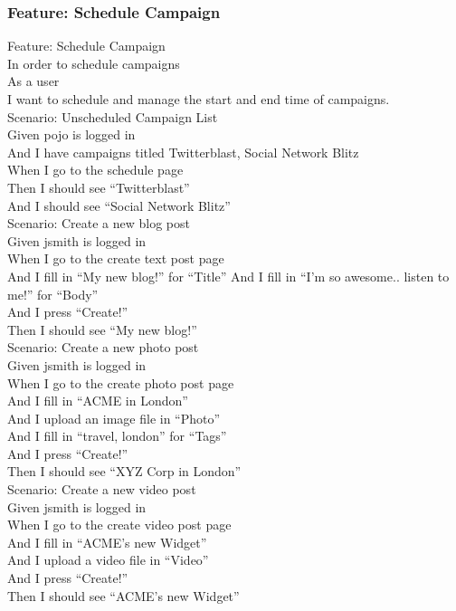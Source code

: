 \documentclass[12pt]{article}
\begin{document}
\subsubsection{Feature: Schedule Campaign}

\begin{hangparas}{0.25in}{1}
Feature: Schedule Campaign \\
In order to schedule campaigns \\
As a user \\
I want to schedule and manage the start and end time of campaigns. \\

Scenario: Unscheduled Campaign List \\
  Given pojo is logged in \\
  And I have campaigns titled Twitterblast, Social Network Blitz \\
  When I go to the schedule page \\
  Then I should see ``Twitterblast'' \\
  And I should see ``Social Network Blitz'' \\
  
Scenario: Create a new blog post \\
  Given jsmith is logged in \\
  When I go to the create text post page \\
  And I fill in ``My new blog!'' for ``Title''
  And I fill in ``I'm so awesome.. listen to me!'' for ``Body'' \\
  And I press ``Create!'' \\
  Then I should see ``My new blog!'' \\
  
Scenario: Create a new photo post \\
  Given jsmith is logged in \\
  When I go to the create photo post page \\
  And I fill in ``ACME in London'' \\
  And I upload an image file in ``Photo'' \\
  And I fill in ``travel, london'' for ``Tags'' \\
  And I press ``Create!'' \\
  Then I should see ``XYZ Corp in London'' \\
  
  Scenario: Create a new video post \\
    Given jsmith is logged in \\
    When I go to the create video post page \\
    And I fill in ``ACME's new Widget'' \\
    And I upload a video file in ``Video'' \\
    And I press ``Create!'' \\
    Then I should see ``ACME's new Widget'' \\
  

\end{hangparas}
\end{document}
